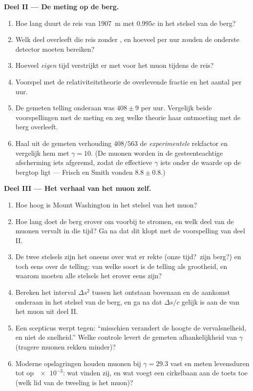\begin{problem}
\medskip\noindent\textbf{Deel II --- De meting op de berg.}
\begin{enumerate}[resume]
  \item Hoe lang duurt de reis van \qty{1907}{m} met $0.995c$ in het
        stelsel van de berg?
  \item Welk deel overleeft die reis zonder , en hoeveel per uur
        zouden de onderste detector moeten bereiken?
  \item Hoeveel \emph{eigen} tijd verstrijkt er met  voor het
        muon tijdens de reis?
  \item Voorspel met de relativiteitstheorie de overlevende fractie en
        het aantal per uur.
  \item De gemeten telling onderaan was $408 \pm 9$ per uur. Vergelijk
        beide voorspellingen met de meting en zeg welke theorie haar
        ontmoeting met de berg overleeft.
  \item Haal uit de gemeten verhouding $408/563$ de
        \emph{experimentele} rekfactor en vergelijk hem met $\gamma = 10$. (De muonen worden in de gesteenteachtige afscherming iets
        afgeremd, zodat de effectieve $\gamma$ iets onder de waarde op
        de bergtop ligt --- Frisch en Smith vonden $8.8 \pm
        0.8$.)
\end{enumerate}

\medskip\noindent\textbf{Deel III --- Het verhaal van het muon zelf.}
\begin{enumerate}[resume]
  \item Hoe hoog is Mount Washington in het stelsel van het muon?
  \item Hoe lang doet de berg erover om voorbij te stromen, en welk deel
        van de muonen vervalt in die tijd? Ga na dat dit klopt met de
        voorspelling van deel II.
  \item De twee stelsels zijn het oneens over wat er rekte (onze tijd?\
        zijn berg?) en toch eens over de telling: van welke soort is de
        telling als grootheid, en waarom moeten alle stelsels het erover
        eens zijn?
  \item Bereken het interval $\Delta s^2$ tussen het ontstaan bovenaan
        en de aankomst onderaan in het stelsel van de berg, en ga na dat
        $\Delta s/c$ gelijk is aan de  van het muon uit deel
        II.
  \item Een scepticus werpt tegen: ``misschien verandert de hoogte de
        vervalsnelheid, en niet de snelheid.'' Welke controle levert de
        gemeten afhankelijkheid van $\gamma$ (tragere muonen rekken
        minder)?
  \item Moderne opslagringen houden muonen bij $\gamma = 29.3$ vast en
        meten levensduren tot op $\num{e-3}$: wat vinden zij, en wat
        voegt een cirkelbaan aan de toets toe (welk lid van de tweeling
        is het muon)?
\end{enumerate}


\end{problem}
